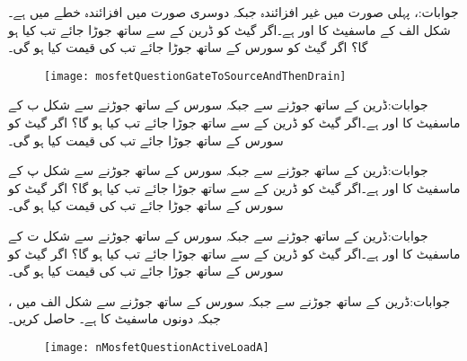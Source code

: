 جوابات:،  پہلی صورت میں غیر افزائندہ جبکہ دوسری صورت میں افزائندہ خطے میں ہے۔
شکل  الف کے ماسفیٹ کا  اور  ہے۔اگر گیٹ کو ڈرین کے سے ساتھ جوڑا جائے تب  کیا ہو گا؟ اگر گیٹ کو سورس کے ساتھ جوڑا جائے تب  کی قیمت کیا ہو گی۔
\begin{figure}
\centering
\texttt{[image: mosfetQuestionGateToSourceAndThenDrain]}
\caption{}
\label{شکل_ماسفیٹ_گیٹ_مخارج_اور_گیٹ_محاصل}
\end{figure}
جوابات:ڈرین کے ساتھ جوڑنے سے  جبکہ سورس کے ساتھ جوڑنے سے  
شکل  ب کے ماسفیٹ کا  اور  ہے۔اگر گیٹ کو ڈرین کے سے ساتھ جوڑا جائے تب  کیا ہو گا؟ اگر گیٹ کو سورس کے ساتھ جوڑا جائے تب  کی قیمت کیا ہو گی۔

جوابات:ڈرین کے ساتھ جوڑنے سے  جبکہ سورس کے ساتھ جوڑنے سے 
شکل  پ کے ماسفیٹ کا  اور  ہے۔اگر گیٹ کو ڈرین کے سے ساتھ جوڑا جائے تب  کیا ہو گا؟ اگر گیٹ کو سورس کے ساتھ جوڑا جائے تب  کی قیمت کیا ہو گی۔

جوابات:ڈرین کے ساتھ جوڑنے سے  جبکہ سورس کے ساتھ جوڑنے سے  
شکل  ت کے ماسفیٹ کا  اور  ہے۔اگر گیٹ کو ڈرین کے سے ساتھ جوڑا جائے تب  کیا ہو گا؟ اگر گیٹ کو سورس کے ساتھ جوڑا جائے تب  کی قیمت کیا ہو گی۔

جوابات:ڈرین کے ساتھ جوڑنے سے  جبکہ سورس کے ساتھ جوڑنے سے 
شکل  الف میں ،   جبکہ دونوں ماسفیٹ کا  ہے۔ حاصل کریں۔  
\begin{figure}
\centering
\texttt{[image: nMosfetQuestionActiveLoadA]}
\caption{}
\label{شکل_ماسفیٹ_سوال_ماسفیٹ_بار}
\end{figure}

